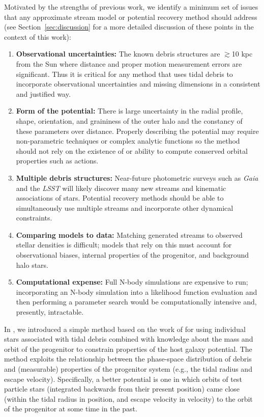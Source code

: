 \documentclass[letterpaper,12pt,preprint]{aastex}
\newcommand{\project}[1]{\textsl{#1}}
\newcommand{\gaia}{\project{Gaia}}
\begin{document}
Motivated by the strengths of previous work, we identify a minimum set of issues that any approximate stream model or potential recovery method should address (see Section~\ref{sec:discussion} for a more detailed discussion of these points in the context of this work):
\begin{enumerate}
	\item \textbf{Observational uncertainties:} The known debris structures are $\gtrsim$10 kpc from the Sun where distance and proper motion measurement errors are significant. Thus it is critical for any method that uses tidal debris to incorporate observational uncertainties and missing dimensions in a consistent and justified way. 
	\item \textbf{Form of the potential:} There is large uncertainty in the radial profile, shape, orientation, and graininess of the outer halo and the constancy of these parameters over distance. Properly describing the potential may require non-parametric techniques or complex analytic functions so the method should not rely on the existence of or ability to compute conserved orbital properties such as actions.
	\item \textbf{Multiple debris structures:} Near-future photometric surveys such as \gaia\, and the \project{LSST} will likely discover many new streams and kinematic associations of stars. Potential recovery methods should be able to simultaneously use multiple streams and incorporate other dynamical constraints.
	\item \textbf{Comparing models to data:} Matching generated streams to observed stellar densities is difficult; models that rely on this must account for observational biases, internal properties of the progenitor, and background halo stars. 
	\item \textbf{Computational expense:} Full N-body simulations are expensive to run; incorporating an N-body simulation into a likelihood function evaluation and then performing a parameter search would be computationally intensive and, presently, intractable.
\end{enumerate}

In \citet{apw13}, we introduced a simple method based on the work of \citet{johnston99a} for using individual stars associated with tidal debris combined with knowledge about the mass and orbit of the progenitor to constrain properties of the host galaxy potential. The method exploits the relationship between the phase-space distribution of debris and (measurable) properties of the progenitor system (e.g., the tidal radius and escape velocity).  Specifically, a better potential is one in which orbits of test particle stars (integrated backwards from their present position) came close (within the tidal radius in position, and escape velocity in velocity) to the orbit of the progenitor at some time in the past. 
\end{document}
